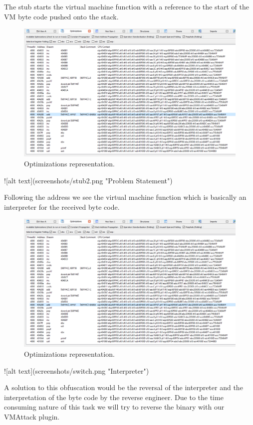 \documentclass[10pt,twoside,a4paper,bibliography=totoc]{scrbook}
\begin{document}
The stub starts the virtual machine function with a reference to the start of the VM byte code pushed onto the stack.

\begin{figure}[htp]
\centering
\includegraphics[scale=0.55]{images/ch3/optimizations_success.png}
\caption{Optimizations representation.}
\label{opti_add_success}
\end{figure}
![alt text](screenshots/stub2.png "Problem Statement")

Following the address we see the virtual machine function which is basically an interpreter for the received byte code.

\begin{figure}[htp]
\centering
\includegraphics[scale=0.55]{images/ch3/optimizations_success.png}
\caption{Optimizations representation.}
\label{opti_add_success}
\end{figure}
![alt text](screenshots/switch.png "Interpreter")

A solution to this obfuscation would be the reversal of the interpreter and the interpretation of the byte code by the reverse engineer. Due to the time consuming nature of this task we will try to reverse the binary with our VMAttack plugin.
\end{document}
